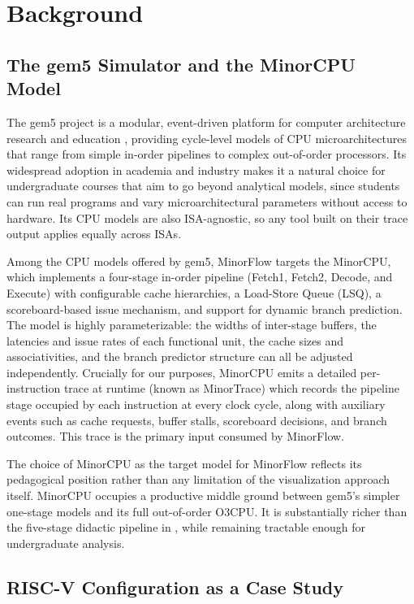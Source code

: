 \documentclass{ceurart}
\begin{document}
\section{Background}
\label{sec:background}

\subsection{The gem5 Simulator and the MinorCPU Model}

The gem5 project is a modular, event-driven platform for computer architecture research and education \cite{binkert2011gem5}, providing cycle-level models of CPU microarchitectures that range from simple in-order pipelines to complex out-of-order processors. Its widespread adoption in academia and industry makes it a natural choice for undergraduate courses that aim to go beyond analytical models, since students can run real programs and vary microarchitectural parameters without access to hardware. Its CPU models are also ISA-agnostic, so any tool built on their trace output applies equally across ISAs.

Among the CPU models offered by gem5, MinorFlow targets the MinorCPU, which implements a four-stage in-order pipeline (Fetch1, Fetch2, Decode, and Execute) with configurable cache hierarchies, a Load-Store Queue (LSQ), a scoreboard-based issue mechanism, and support for dynamic branch prediction. The model is highly parameterizable: the widths of inter-stage buffers, the latencies and issue rates of each functional unit, the cache sizes and associativities, and the branch predictor structure can all be adjusted independently. Crucially for our purposes, MinorCPU emits a detailed per-instruction trace at runtime (known as MinorTrace) which records the pipeline stage occupied by each instruction at every clock cycle, along with auxiliary events such as cache requests, buffer stalls, scoreboard decisions, and branch outcomes. This trace is the primary input consumed by MinorFlow.

The choice of MinorCPU as the target model for MinorFlow reflects its pedagogical position rather than any limitation of the visualization approach itself. MinorCPU occupies a productive middle ground between gem5's simpler one-stage models and its full out-of-order O3CPU. It is substantially richer than the five-stage didactic pipeline in \cite{patterson2020computer}, while remaining tractable enough for undergraduate analysis. 

\subsection{RISC-V Configuration as a Case Study}
\end{document}
